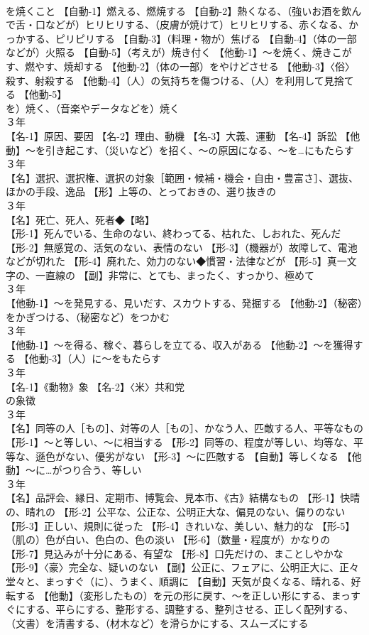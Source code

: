 \documentclass[8pt]{extreport}
\begin{document}
\begin{CJK}{UTF8}{min}
\\	を焼くこと 【自動-1】燃える、燃焼する 【自動-2】熱くなる、（強いお酒を飲んで舌・口などが）ヒリヒリする、（皮膚が焼けて）ヒリヒリする、赤くなる、かっかする、ピリピリする 【自動-3】（料理・物が）焦げる 【自動-4】（体の一部などが）火照る 【自動-5】（考えが）焼き付く 【他動-1】～を焼く、焼きこがす、燃やす、焼却する 【他動-2】（体の一部）をやけどさせる 【他動-3】〈俗〉殺す、射殺する 【他動-4】（人）の気持ちを傷つける、（人）を利用して見捨てる 【他動-5】
\\	を）焼く、（音楽やデータなどを）焼く
\\	３年	
\\	【名-1】原因、要因 【名-2】理由、動機 【名-3】大義、運動 【名-4】訴訟 【他動】～を引き起こす、（災いなど）を招く、～の原因になる、～を…にもたらす
\\	３年	
\\	【名】選択、選択権、選択の対象［範囲・候補・機会・自由・豊富さ］、選抜、ほかの手段、逸品 【形】上等の、とっておきの、選り抜きの
\\	３年	
\\	【名】死亡、死人、死者◆【略】
\\	【形-1】死んでいる、生命のない、終わってる、枯れた、しおれた、死んだ 【形-2】無感覚の、活気のない、表情のない 【形-3】（機器が）故障して、電池などが切れた 【形-4】廃れた、効力のない◆慣習・法律などが 【形-5】真一文字の、一直線の 【副】非常に、とても、まったく、すっかり、極めて
\\	３年	
\\	【他動-1】～を発見する、見いだす、スカウトする、発掘する 【他動-2】（秘密）をかぎつける、（秘密など）をつかむ
\\	３年	
\\	【他動-1】～を得る、稼ぐ、暮らしを立てる、収入がある 【他動-2】～を獲得する 【他動-3】（人）に～をもたらす
\\	３年	
\\	【名-1】《動物》象 【名-2】〈米〉共和党
\\	の象徴
\\	３年	
\\	【名】同等の人［もの］、対等の人［もの］、かなう人、匹敵する人、平等なもの 【形-1】～と等しい、～に相当する 【形-2】同等の、程度が等しい、均等な、平等な、遜色がない、優劣がない 【形-3】～に匹敵する 【自動】等しくなる 【他動】～に…がつり合う、等しい
\\	３年	
\\	【名】品評会、縁日、定期市、博覧会、見本市、《古》結構なもの 【形-1】快晴の、晴れの 【形-2】公平な、公正な、公明正大な、偏見のない、偏りのない 【形-3】正しい、規則に従った 【形-4】きれいな、美しい、魅力的な 【形-5】（肌の）色が白い、色白の、色の淡い 【形-6】（数量・程度が）かなりの 【形-7】見込みが十分にある、有望な 【形-8】口先だけの、まことしやかな 【形-9】〈豪〉完全な、疑いのない 【副】公正に、フェアに、公明正大に、正々堂々と、まっすぐ（に）、うまく、順調に 【自動】天気が良くなる、晴れる、好転する 【他動】（変形したもの）を元の形に戻す、～を正しい形にする、まっすぐにする、平らにする、整形する、調整する、整列させる、正しく配列する、（文書）を清書する、（材木など）を滑らかにする、スムーズにする

\end{CJK}
\end{document}

